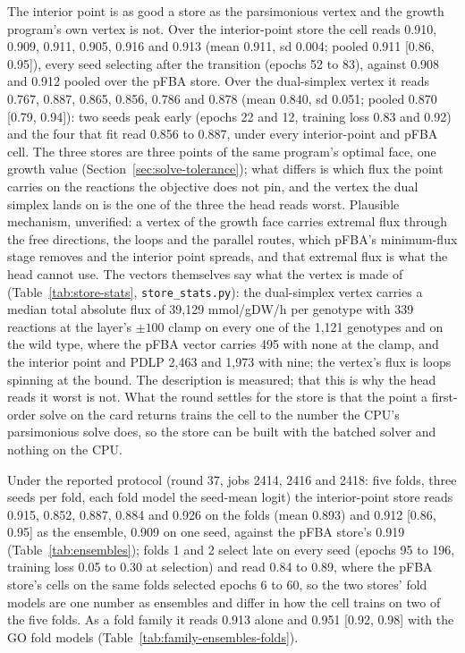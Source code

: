 The interior point is as good a store as the parsimonious vertex and the growth
program's own vertex is not. Over the interior-point store the cell reads 0.910,
0.909, 0.911, 0.905, 0.916 and 0.913 (mean 0.911, sd 0.004; pooled 0.911 [0.86,
0.95]), every seed selecting after the transition (epochs 52 to 83), against 0.908
and 0.912 pooled over the pFBA store. Over the dual-simplex vertex it reads 0.767,
0.887, 0.865, 0.856, 0.786 and 0.878 (mean 0.840, sd 0.051; pooled 0.870 [0.79,
0.94]): two seeds peak early (epochs 22 and 12, training loss 0.83 and 0.92) and the
four that fit read 0.856 to 0.887, under every interior-point and pFBA cell. The
three stores are three points of the same program's optimal face, one growth value
(Section~\ref{sec:solve-tolerance}); what differs is which flux the point carries on
the reactions the objective does not pin, and the vertex the dual simplex lands on
is the one of the three the head reads worst. Plausible mechanism, unverified: a
vertex of the growth face carries extremal flux through the free directions, the
loops and the parallel routes, which pFBA's minimum-flux stage removes and the
interior point spreads, and that extremal flux is what the head cannot use. The
vectors themselves say what the vertex is made of (Table~\ref{tab:store-stats},
\texttt{store\_stats.py}): the dual-simplex vertex carries a median total absolute
flux of 39,129 mmol/gDW/h per genotype with 339 reactions at the layer's $\pm100$
clamp on every one of the 1,121 genotypes and on the wild type, where the pFBA
vector carries 495 with none at the clamp, and the interior point and PDLP 2,463
and 1,973 with nine; the vertex's flux is loops spinning at the bound. The
description is measured; that this is why the head reads it worst is not. What the
round settles for the store is that the point a first-order solve on the card
returns trains the cell to the number the CPU's parsimonious solve does, so the store
can be built with the batched solver and nothing on the CPU.

 Under the reported
protocol (round 37, jobs 2414, 2416 and 2418: five folds, three seeds per fold, each
fold model the seed-mean logit) the interior-point store reads 0.915, 0.852, 0.887,
0.884 and 0.926 on the folds (mean 0.893) and 0.912 [0.86, 0.95] as the ensemble,
0.909 on one seed, against the pFBA store's 0.919 (Table~\ref{tab:ensembles}); folds
1 and 2 select late on every seed (epochs 95 to 196, training loss 0.05 to 0.30 at
selection) and read 0.84 to 0.89, where the pFBA store's cells on the same folds
selected epochs 6 to 60, so the two stores' fold models are one number as ensembles
and differ in how the cell trains on two of the five folds. As a fold family it
reads 0.913 alone and 0.951 [0.92, 0.98] with the GO fold models
(Table~\ref{tab:family-ensembles-folds}).

